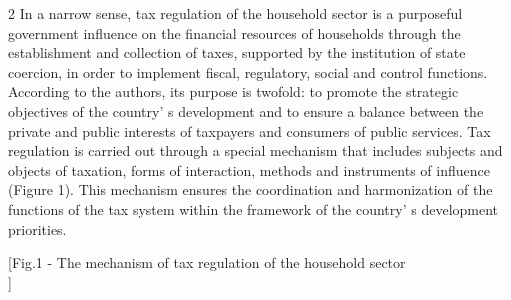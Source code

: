 \begin{multicols}{2}
In a narrow sense, tax regulation of the household sector is a
purposeful government influence on the financial resources of households
through the establishment and collection of taxes, supported by the
institution of state coercion, in order to implement fiscal, regulatory,
social and control functions. According to the authors, its purpose is
twofold: to promote the strategic objectives of the
country' s development and to ensure a balance between
the private and public interests of taxpayers and consumers of public
services. Tax regulation is carried out through a special mechanism that
includes subjects and objects of taxation, forms of interaction, methods
and instruments of influence (Figure 1). This mechanism ensures the
coordination and harmonization of the functions of the tax system within
the framework of the country' s development priorities.
\end{multicols}

[Fig.1 - The mechanism of tax regulation of the household sector\\]

